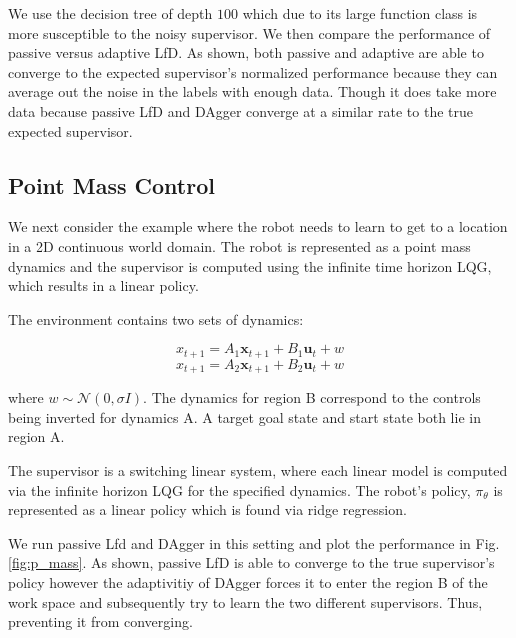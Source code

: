 \documentclass[10pt, conference]{ieeeconf}      %
\newcommand{\bu}{\mathbf{u}}
\newcommand{\bx}{\mathbf{x}}
\begin{document}
We use the  decision tree  of depth $100$ which due to its large function class is more susceptible to the noisy supervisor. We then compare the performance of passive versus adaptive LfD. As shown, both passive and adaptive are able to converge to the expected supervisor's normalized performance because they can average out the noise in the labels with enough data. Though it does take more data because passive LfD  and DAgger converge at a similar rate to the true expected supervisor. 




\subsection{Point Mass Control}
We next consider the example where the robot needs to learn to get to a location in a 2D continuous world domain. The robot is represented as a point mass dynamics and the supervisor is computed using the infinite time horizon LQG, which results in a linear policy. 

The environment contains two sets of dynamics: 

$$x_{t+1} = A_1\bx_{t+1}+B_1\bu_t+w$$
$$x_{t+1} = A_2\bx_{t+1}+B_2\bu_t + w$$

where $w\sim \mathcal{N}(0,\sigma I)$. The dynamics for region B correspond to the controls being inverted for dynamics A. A target goal state and start state both lie in region A. 

The supervisor is a switching linear system, where each linear model is computed via the infinite horizon LQG for the specified dynamics. The robot's policy, $\pi_{\theta}$ is represented as a linear policy which is found via ridge regression.

We run passive Lfd and DAgger in this setting and plot the performance in Fig. \ref{fig:p_mass}. As shown, passive LfD is able to converge to the true supervisor's policy however the adaptivitiy of DAgger forces it to enter the region B of the work space and subsequently try to learn the two different supervisors. Thus, preventing it from converging. 
\end{document}
